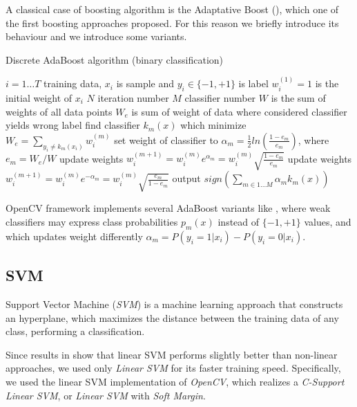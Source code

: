 A classical case of boosting algorithm is the Adaptative Boost ()\cite{Friedman98additivelogistic}, which one of the first boosting approaches proposed. For this reason we briefly introduce its behaviour and we introduce some variants.

\begin{algorithm}
\caption{Discrete AdaBoost algorithm (binary classification)} 
\label{alg:adaboost}
\begin{algorithmic}
\STATE $i=1 \ldots T$ training data, $x_i$ is sample and $y_i \in \{-1,+1\}$ is label
\STATE $w_{i}^{(1)}=1$ is the initial weight of $x_i$
\STATE $N$ iteration number
\STATE $M$ classifier number
\STATE $W$ is the sum of weights of all data points
\STATE $W_e$ is sum of weight of data where considered classifier yields wrong label
		\STATE find classifier $k_{m}(x)$ which minimize $W_e=\sum_{y_i \neq k_m(x_i)}{w_{i}^{(m)}}$
		\STATE set weight of classifier to $\alpha_{m}=\frac{1}{2}ln(\frac{1-e_m}{e_m}) $, where $e_m=W_e/W$
	 		\STATE update weights $w_{i}^{(m+1)}=w_{i}^{(m)}e^{\alpha_m}=w_{i}^{(m)}\sqrt{\frac{1-e_m}{e_m}}$
		\ELSE
			\STATE update weights $w_{i}^{(m+1)}=w_{i}^{(m)}e^{-\alpha_m}=w_{i}^{(m)}\sqrt{\frac{e_m}{1-e_m}}$
 		\ENDIF
\STATE output $sign( \sum_{m \in 1 \ldots M}{ \alpha_m k_m (x)} )$
\ENDFOR
\end{algorithmic}
\end{algorithm}

OpenCV framework implements several AdaBoost variants like , where weak classifiers may express class probabilities $p_m(x)$ instead of $\{-1,+1\}$ values, and  which updates weight differently $\alpha_{m}=P(y_i=1|x_i)-P(y_i=0|x_i)$. 


\subsection{SVM}

Support Vector Machine (\emph{SVM}) is a machine learning approach that
 constructs an hyperplane, which maximizes the distance between the training
 data of any class, performing a classification.
 
 Since results in \cite{Littlewort04dynamicsof} show that linear SVM performs
 slightly better than non-linear approaches, we used only \emph{Linear SVM} for
 its faster training speed. Specifically, we used the linear SVM implementation
 of \emph{OpenCV}, which realizes a \emph{C-Support Linear SVM}, or \emph{Linear
 SVM} with \emph{Soft Margin}.
 
